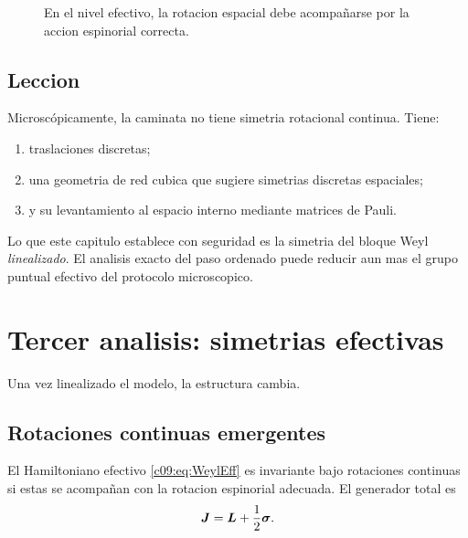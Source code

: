 \begin{figure}[h!]
\centering
{}
\caption{En el nivel efectivo, la rotacion espacial debe acompa\~narse por la accion espinorial correcta.}
\end{figure}

\subsection{Leccion}
Microscópicamente, la caminata no tiene simetria rotacional continua. Tiene:
\begin{enumerate}[label=\arabic*.]
    \item traslaciones discretas;
    \item una geometria de red cubica que sugiere simetrias discretas espaciales;
    \item y su levantamiento al espacio interno mediante matrices de Pauli.
\end{enumerate}

Lo que este capitulo establece con seguridad es la simetria del bloque Weyl \emph{linealizado}. El analisis exacto del paso ordenado puede reducir aun mas el grupo puntual efectivo del protocolo microscopico.

\section{Tercer analisis: simetrias efectivas}
Una vez linealizado el modelo, la estructura cambia.

\subsection{Rotaciones continuas emergentes}
El Hamiltoniano efectivo \eqref{c09:eq:WeylEff} es invariante bajo rotaciones continuas si estas se acompa\~nan con la rotacion espinorial adecuada. El generador total es
\begin{equation}
\bm{J} = \bm{L} + \frac{1}{2}\bm{\sigma}.
\label{c09:eq:J}
\end{equation}

